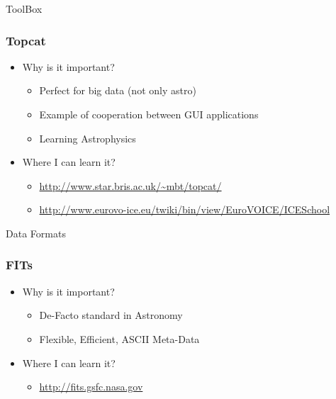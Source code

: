 \documentclass[fleqn]{beamer}
\begin{document}
\begin{section}{ToolBox}
\begin{frame}
\begin{itemize}
\begin{itemize}
      \end{itemize}
  \end{itemize}
  \end{frame}


  \begin{frame}\frametitle{Topcat}
  \begin{itemize}
    \item{Why is it important?}
      \begin{itemize}
      \item Perfect for big data (not only astro) 
      \item Example of cooperation between GUI applications
      \item Learning Astrophysics

      \end{itemize}
    \item{Where I can learn it?}
      \begin{itemize}
      \item \url{http://www.star.bris.ac.uk/~mbt/topcat/}
      \item \url{http://www.eurovo-ice.eu/twiki/bin/view/EuroVOICE/ICESchool}

      \end{itemize}
  \end{itemize}
  \end{frame}




\begin{section}{Data Formats}

  \begin{frame}\frametitle{FITs}
  \begin{itemize}
    \item{Why is it important?}
      \begin{itemize}
      \item De-Facto standard in Astronomy
      \item Flexible, Efficient, ASCII Meta-Data
      \end{itemize}
    \item{Where I can learn it?}
      \begin{itemize}
      \item \url{http://fits.gsfc.nasa.gov}
      \end{itemize}
  \end{itemize}
  \end{frame}


\end{section}
\end{section}
\end{document}
